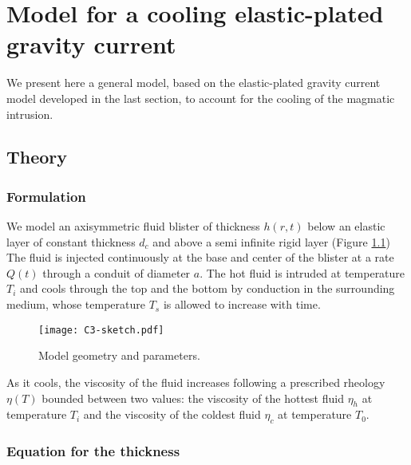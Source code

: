 \chapter{Model  for a  cooling elastic-plated  gravity
  current}
\label{chap3}
\minitoc

We present here  a general model, based on  the elastic-plated gravity
current  model developed  in  the  last section,  to  account for  the
cooling of the magmatic intrusion.

\section{Theory}
\label{C3-sec:theory}

\subsection{Formulation}
\label{C3-sec:formulation}

We model an axisymmetric fluid  blister of thickness $h(r,t)$ below an
elastic layer  of constant thickness  $d_c$ and above a  semi infinite
rigid layer \citep{Michaut:2011kg}  (Figure \ref{C3-sketch}) The fluid
is injected  continuously at the base  and center of the  blister at a
rate $Q(t)$  through a  conduit of  diameter $a$.  The hot  fluid is
intruded at temperature $T_i$ and cools through the top and the bottom
by conduction  in the surrounding  medium, whose temperature  $T_s$ is
allowed to increase with time.

\begin{figure}[htbp]
  \begin{center}
    \graphicspath{ {/Users/thorey/Documents/These/Manuscript/Figure/Chapter3/} }
    \texttt{[image: C3-sketch.pdf]}
    \caption{Model geometry and parameters.}
    \label{C3-sketch}
  \end{center}
\end{figure}

As  it  cools,  the  viscosity  of the  fluid  increases  following  a
prescribed  rheology   $\eta(T)$  bounded  between  two   values:  the
viscosity of the  hottest fluid $\eta_h$ at temperature  $T_i$ and the
viscosity of the coldest fluid $\eta_c$ at temperature $T_0$.

\subsection{Equation for the thickness}

